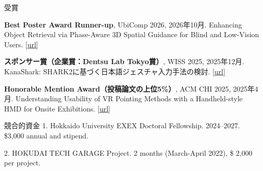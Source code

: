 \documentclass[
	11pt, %
]{resume} %
\begin{document}
\begin{rSection}{受賞}{}{}{}
	\item \textbf{Best Poster Award Runner-up}, UbiComp 2026, 2026年10月. Enhancing Object Retrieval via Phase-Aware 3D Spatial Guidance for Blind and Low-Vision Users. [\href{https://www.ubicomp.org/ubicomp-iswc-2026/awards-all/}{url}]
	\item \textbf{スポンサー賞（企業賞：Dentsu Lab Tokyo賞）}, WISS 2025, 2025年12月. KanaShark: SHARK2に基づく日本語ジェスチャ入力手法の検討. [\href{https://www.wiss.org/WISS2025/award.html}{url}]
	\item \textbf{Honorable Mention Award（投稿論文の上位5\%）}, ACM CHI 2025, 2025年4月. Understanding Usability of VR Pointing Methods with a Handheld-style HMD for Onsite Exhibitions. [\href{https://programs.sigchi.org/chi/2025/awards/honorable-mentions}{url}]
\end{rSection}
\begin{rSection}{競合的資金}
1. Hokkaido University EXEX Doctoral Fellowship. 2024--2027. \$3,000 annual and stipend.

2. HOKUDAI TECH GARAGE Project. 2 months (March-April 2022), \$ 2,000 per project.
\end{rSection}
\end{document}
